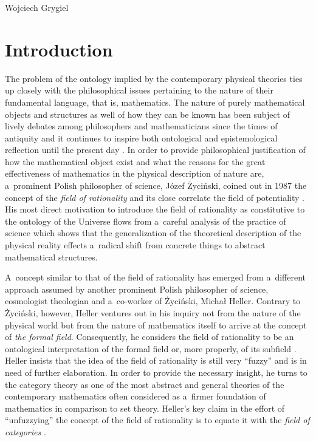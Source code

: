 \begin{artengenv}{Wojciech Grygiel}
\section{Introduction}
\lettrine[loversize=0.13,lines=2,lraise=-0.01,nindent=0em,findent=0.2pt]%
{T}{}he problem of the ontology implied by the contemporary physical theories ties up closely with the philosophical issues pertaining to the nature of their fundamental language, that is, mathematics. The nature of purely mathematical objects and structures as well of how they can be known has been subject of lively debates among philosophers and mathematicians since the times of antiquity and it continues to inspire both ontological and epistemological reflection until the present day
\parencite[e.g.][]{shapiro_thinking_2000}. %
 In order to provide philosophical justification of how the mathematical object exist and what the reasons for the great effectiveness of mathematics in the physical description of nature are, a~prominent Polish philosopher of science, Józef Życiński, coined out in 1987 the concept of the \textit{field of rationality} and its close correlate the field of potentiality 
\parencites[][]{zycinski_filozoficzne_1987}[][]{zycinski_teizm_1988}. %
 His most direct motivation to introduce the field of rationality as constitutive to the ontology of the Universe flows from a~careful analysis of the practice of science which shows that the generalization of the theoretical description of the physical reality effects a~radical shift from concrete things to abstract mathematical structures.

A~concept similar to that of the field of rationality has emerged from a~different approach assumed by another prominent Polish philosopher of science, cosmologist theologian and a~co-worker of Życiński, Michał Heller. Contrary to Życiński, however, Heller ventures out in his inquiry not from the nature of the physical world but from the nature of mathematics itself to arrive at the concept of \textit{the formal field}. Consequently, he considers the field of rationality to be an ontological interpretation of the formal field or, more properly, of its subfield
\parencite[][p.442]{heller_field_2014}. %
 Heller insists that the idea of the field of rationality is still very ``fuzzy'' and is in need of further elaboration. In order to provide the necessary insight, he turns to the category theory as one of the most abstract and general theories of the contemporary mathematics often considered as a~firmer foundation of mathematics in comparison to set theory. Heller's key claim in the effort of ``unfuzzying'' the concept of the field of rationality is to equate it with the \textit{field of categories} 
\parencite[][p.453]{heller_field_2014}.%



\end{artengenv}
